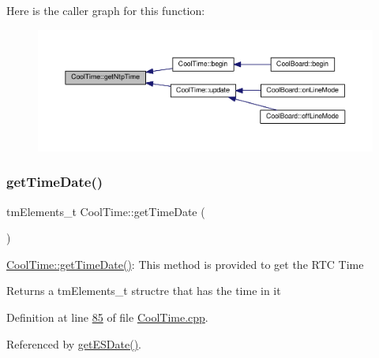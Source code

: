 Here is the caller graph for this function\+:
\nopagebreak
\begin{figure}[H]
\begin{center}
\leavevmode
\includegraphics[width=350pt]{class_cool_time_a41fbbbfd651c2079f54d4b2911e4c705_icgraph}
\end{center}
\end{figure}
\mbox{\label{class_cool_time_a7a7501c5ca77dd1248bea704c44f986c}} 
\subsubsection{\texorpdfstring{get\+Time\+Date()}{getTimeDate()}}
{\footnotesize\ttfamily tm\+Elements\+\_\+t Cool\+Time\+::get\+Time\+Date (\begin{DoxyParamCaption}{ }\end{DoxyParamCaption})}

\hyperlink{class_cool_time_a7a7501c5ca77dd1248bea704c44f986c}{Cool\+Time\+::get\+Time\+Date()}\+: This method is provided to get the R\+TC Time

\begin{DoxyReturn}{Returns}
a tm\+Elements\+\_\+t structre that has the time in it 
\end{DoxyReturn}


Definition at line \hyperlink{_cool_time_8cpp_source_l00085}{85} of file \hyperlink{_cool_time_8cpp_source}{Cool\+Time.\+cpp}.



Referenced by \hyperlink{_cool_time_8cpp_source_l00101}{get\+E\+S\+Date()}.


